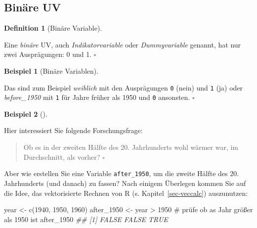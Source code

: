 \documentclass[
  letterpaper,
  twoside,
  open=any]{scrbook}
\newenvironment{Shaded}{\begin{snugshade}}{\end{snugshade}}
\newcommand{\CommentTok}[1]{\textcolor[rgb]{0.37,0.37,0.37}{#1}}
\newcommand{\DecValTok}[1]{\textcolor[rgb]{0.68,0.00,0.00}{#1}}
\newcommand{\DocumentationTok}[1]{\textcolor[rgb]{0.37,0.37,0.37}{\textit{#1}}}
\newcommand{\FunctionTok}[1]{\textcolor[rgb]{0.28,0.35,0.67}{#1}}
\newcommand{\NormalTok}[1]{\textcolor[rgb]{0.00,0.23,0.31}{#1}}
\newcommand{\OtherTok}[1]{\textcolor[rgb]{0.00,0.23,0.31}{#1}}
\newcommand{\SpecialCharTok}[1]{\textcolor[rgb]{0.37,0.37,0.37}{#1}}
\theoremstyle{definition}
\theoremstyle{definition}
\newtheorem{example}{Beispiel}[chapter]
\theoremstyle{definition}
\newtheorem{definition}{Definition}[chapter]
\theoremstyle{remark}
\begin{document}
\subsection{Binäre UV}\label{binuxe4re-uv}

\begin{definition}[Binäre
Variable]\protect\hypertarget{def-binvar}{}\label{def-binvar}

Eine \emph{binäre} UV, auch \emph{Indikatorvariable} oder
\emph{Dummyvariable} genannt, hat nur zwei Ausprägungen: 0 und 1.
\(\square\)

\end{definition}

\begin{example}[Binäre
Variablen]\protect\hypertarget{exm-bin}{}\label{exm-bin}

Das sind zum Beispiel \emph{weiblich} mit den Ausprägungen \texttt{0}
(nein) und \texttt{1} (ja) oder \emph{before\_1950} mit \texttt{1} für
Jahre früher als 1950 und \texttt{0} ansonsten. \(\square\)

\end{example}

\begin{example}[]\protect\hypertarget{exm-binuv}{}\label{exm-binuv}

Hier interessiert Sie folgende Forschungsfrage:

\begin{quote}
{} Ob es in der zweiten Hälfte des 20. Jahrhunderts wohl
wärmer war, im Durchschnitt, als vorher? \(\square\)
\end{quote}

\end{example}

Aber wie erstellen Sie eine Variable \texttt{after\_1950}, um die zweite
Hälfte des 20. Jahrhunderts (und danach) zu fassen? Nach einigem
Überlegen kommen Sie auf die Idee, das vektorisierte Rechnen von R (s.
Kapitel~\ref{sec-veccalc}) auszunutzen:

\begin{Shaded}
\begin{Highlighting}[]
\NormalTok{year }\OtherTok{\textless{}{-}} \FunctionTok{c}\NormalTok{(}\DecValTok{1940}\NormalTok{, }\DecValTok{1950}\NormalTok{, }\DecValTok{1960}\NormalTok{)}
\NormalTok{after\_1950 }\OtherTok{\textless{}{-}}\NormalTok{ year }\SpecialCharTok{\textgreater{}} \DecValTok{1950}  \CommentTok{\# prüfe ob as Jahr größer als 1950 ist}
\NormalTok{after\_1950}
\DocumentationTok{\#\# [1] FALSE FALSE  TRUE}
\end{Highlighting}
\end{Shaded}
\end{document}
